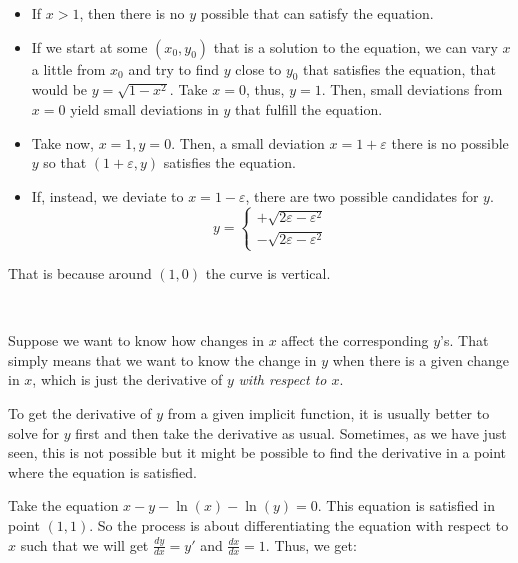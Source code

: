 \documentclass[11pt]{article}
\providecommand{\tightlist}{%
      \setlength{\itemsep}{0pt}\setlength{\parskip}{0pt}}
\theoremstyle{definition}
\theoremstyle{plain}
\begin{document}
\begin{itemize}
\tightlist
\item
  If \(x > 1\), then there is no \(y\) possible that can satisfy the
  equation.
\item
  If we start at some \((x_0, y_0)\) that is a solution to the equation,
  we can vary \(x\) a little from \(x_0\) and try to find \(y\) close to
  \(y_0\) that satisfies the equation, that would be
  \(y = \sqrt{1-x^2}\). Take \(x = 0\), thus, \(y = 1\). Then, small
  deviations from \(x = 0\) yield small deviations in \(y\) that fulfill
  the equation.
\item
  Take now, \(x = 1, y = 0\). Then, a small deviation
  \(x = 1 + \varepsilon\) there is no possible \(y\) so that
  \((1+\varepsilon,y)\) satisfies the equation.
\item
  If, instead, we deviate to \(x = 1-\varepsilon\), there are two
  possible candidates for \(y\). \[
  y = \begin{cases}
  +\sqrt{2\varepsilon-\varepsilon^2} \\
  -\sqrt{2\varepsilon-\varepsilon^2}
  \end{cases}
  \]
\end{itemize}

That is because around \((1,0)\) the curve is vertical.

    \begin{center}
    \end{center}
    { \hspace*{\fill} \\}
    
    Suppose we want to know how changes in \(x\) affect the corresponding
\(y\)'s. That simply means that we want to know the change in \(y\) when
there is a given change in \(x\), which is just the derivative of \(y\)
\emph{with respect to \(x\)}.

To get the derivative of \(y\) from a given implicit function, it is
usually better to solve for \(y\) first and then take the derivative as
usual. Sometimes, as we have just seen, this is not possible but it
might be possible to find the derivative in a point where the equation
is satisfied.

Take the equation \(x-y-\ln(x)-\ln(y) = 0\). This equation is satisfied
in point \((1,1)\). So the process is about differentiating the equation
with respect to \(x\) such that we will get \(\frac{dy}{dx} = y'\) and
\(\frac{dx}{dx} = 1\). Thus, we get:
\end{document}
